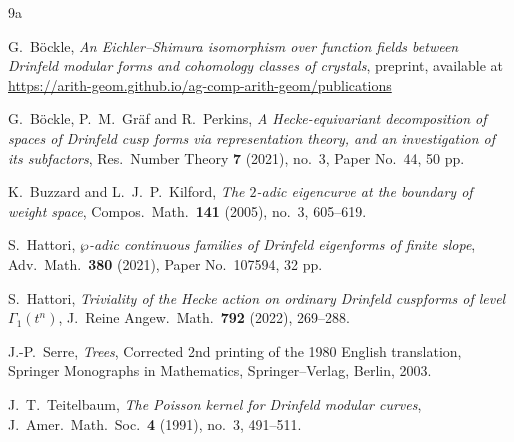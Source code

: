 \documentclass[11pt]{amsart}
\theoremstyle{plain}
\theoremstyle{definition}
\newcommand{\frn}{\mathfrak{n}}
\begin{document}
\begin{thebibliography}{9a}
	


	
G.~B\"{o}ckle, \emph{An Eichler--Shimura isomorphism over function fields between Drinfeld modular forms and cohomology classes of crystals}, preprint, available 
at \url{https://arith-geom.github.io/ag-comp-arith-geom/publications}


G.~B\"{o}ckle, P.~M.~Gr\"{a}f and R.~Perkins,
\emph{A Hecke-equivariant decomposition of spaces of Drinfeld cusp forms via representation theory, and an investigation of its subfactors},
Res.~Number Theory \textbf{7} (2021), no.~3, Paper No.~44, 50 pp.

K.~Buzzard and L.~J.~P.~Kilford,
\emph{The $2$-adic eigencurve at the boundary of weight space},
Compos.~Math.~\textbf{141} (2005), no.~3, 605--619.







S.~Hattori, 
\emph{$\wp$-adic continuous families of Drinfeld eigenforms of finite slope}, 
Adv.~Math.~\textbf{380} (2021), Paper No.~107594, 32 pp.

S.~Hattori,
\emph{Triviality of the Hecke action on ordinary Drinfeld cuspforms of level $\Gamma_1(t^n)$},
J.~Reine Angew.~Math.~\textbf{792} (2022), 269--288.


J.-P.~Serre,
\emph{Trees}, Corrected 2nd printing of the 1980 English translation, Springer Monographs in Mathematics, Springer--Verlag, Berlin, 2003.



J.~T.~Teitelbaum, 
\emph{The Poisson kernel for Drinfeld modular curves}, J.~Amer.~Math.~Soc.~\textbf{4} (1991), no.~3, 491--511. 


\end{thebibliography}
\end{document}
